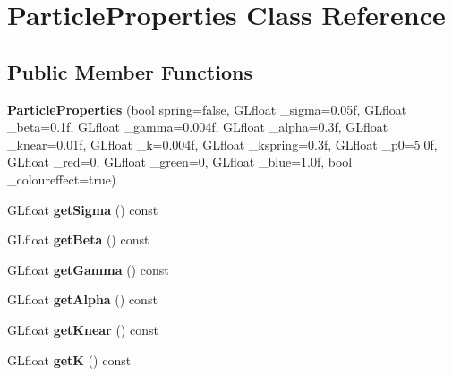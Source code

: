 \hypertarget{classParticleProperties}{\section{Particle\-Properties Class Reference}
\label{classParticleProperties}
}
\subsection*{Public Member Functions}
\begin{DoxyCompactItemize}
\item 
\hypertarget{classParticleProperties_aa1d8a02182b9264effb3d08adbe02c4f}{{\bfseries Particle\-Properties} (bool spring=false, G\-Lfloat \-\_\-sigma=0.\-05f, G\-Lfloat \-\_\-beta=0.\-1f, G\-Lfloat \-\_\-gamma=0.\-004f, G\-Lfloat \-\_\-alpha=0.\-3f, G\-Lfloat \-\_\-knear=0.\-01f, G\-Lfloat \-\_\-k=0.\-004f, G\-Lfloat \-\_\-kspring=0.\-3f, G\-Lfloat \-\_\-p0=5.\-0f, G\-Lfloat \-\_\-red=0, G\-Lfloat \-\_\-green=0, G\-Lfloat \-\_\-blue=1.\-0f, bool \-\_\-coloureffect=true)}\label{classParticleProperties_aa1d8a02182b9264effb3d08adbe02c4f}

\item 
\hypertarget{classParticleProperties_aca9ff4ec7aea1b683873692781b7d2e7}{G\-Lfloat {\bfseries get\-Sigma} () const }\label{classParticleProperties_aca9ff4ec7aea1b683873692781b7d2e7}

\item 
\hypertarget{classParticleProperties_a9ef419fe9734102022bb7612e6caebdf}{G\-Lfloat {\bfseries get\-Beta} () const }\label{classParticleProperties_a9ef419fe9734102022bb7612e6caebdf}

\item 
\hypertarget{classParticleProperties_a072d0400633c0cf1cab12de27dbf6b61}{G\-Lfloat {\bfseries get\-Gamma} () const }\label{classParticleProperties_a072d0400633c0cf1cab12de27dbf6b61}

\item 
\hypertarget{classParticleProperties_a7cd807f48b68ec5f333f4f0a13e8f72e}{G\-Lfloat {\bfseries get\-Alpha} () const }\label{classParticleProperties_a7cd807f48b68ec5f333f4f0a13e8f72e}

\item 
\hypertarget{classParticleProperties_af389c50eb3f1a32f25d121888a65276f}{G\-Lfloat {\bfseries get\-Knear} () const }\label{classParticleProperties_af389c50eb3f1a32f25d121888a65276f}

\item 
\hypertarget{classParticleProperties_a06234cb1c152001040a06e5f551656a1}{G\-Lfloat {\bfseries get\-K} () const }\label{classParticleProperties_a06234cb1c152001040a06e5f551656a1}


\end{DoxyCompactItemize}
